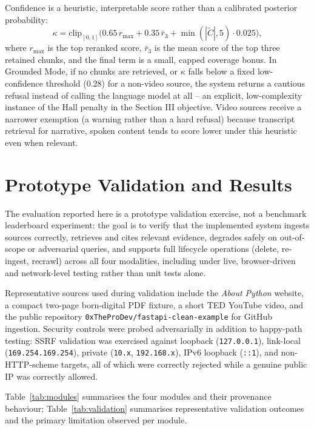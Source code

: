 \documentclass[conference]{IEEEtran}
\begin{document}
Confidence is a heuristic, interpretable score rather than a calibrated
posterior probability:
\begin{equation}
\kappa = \mathrm{clip}_{[0,1]}\Big(0.65\, r_{\max} + 0.35\, \bar r_{3} + \min(|\widetilde{C}|,5)\cdot 0.025\Big),
\end{equation}
where $r_{\max}$ is the top reranked score, $\bar r_3$ is the mean score
of the top three retained chunks, and the final term is a small,
capped coverage bonus. In Grounded Mode, if no chunks are retrieved, or
$\kappa$ falls below a fixed low-confidence threshold ($0.28$) for a
non-video source, the system returns a cautious refusal instead of
calling the language model at all -- an explicit, low-complexity
instance of the $\mathrm{Hall}$ penalty in the Section III objective.
Video sources receive a narrower exemption (a warning rather than a hard
refusal) because transcript retrieval for narrative, spoken content
tends to score lower under this heuristic even when relevant.

\section{Prototype Validation and Results}

The evaluation reported here is a prototype validation exercise, not a
benchmark leaderboard experiment: the goal is to verify that the
implemented system ingests sources correctly, retrieves and cites
relevant evidence, degrades safely on out-of-scope or adversarial
queries, and supports full lifecycle operations (delete, re-ingest,
recrawl) across all four modalities, including under live,
browser-driven and network-level testing rather than unit tests alone.

Representative sources used during validation include the \emph{About
Python} website, a compact two-page born-digital PDF fixture, a short
TED YouTube video, and the public repository
\texttt{0xTheProDev/fastapi-clean-example} for GitHub ingestion. Security
controls were probed adversarially in addition to happy-path testing:
SSRF validation was exercised against loopback (\texttt{127.0.0.1}),
link-local (\texttt{169.254.169.254}), private (\texttt{10.x},
\texttt{192.168.x}), IPv6 loopback (\texttt{::1}), and non-HTTP-scheme
targets, all of which were correctly rejected while a genuine public IP
was correctly allowed.

Table~\ref{tab:modules} summarises the four modules and their
provenance behaviour; Table~\ref{tab:validation} summarises
representative validation outcomes and the primary limitation observed
per module.
\end{document}
